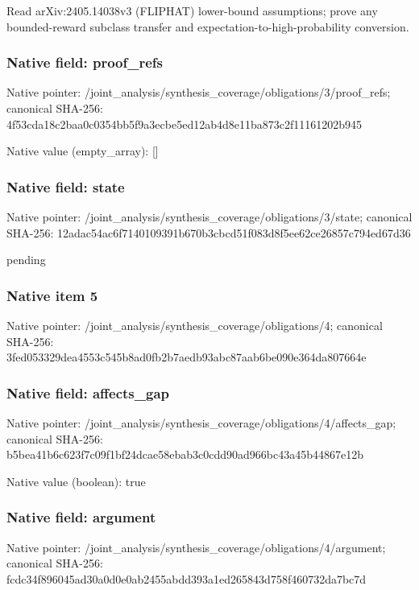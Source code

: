 \documentclass[10pt,a4paper]{article}
\begin{document}
\begingroup\raggedright\sloppy Read arXiv:\allowbreak{}2405.14038v3 (FLIPHAT) lower-bound assumptions;\allowbreak{} prove any bounded-reward subclass transfer and expectation-to-high-probability conversion.\par\endgroup

\subsubsection{Native field: proof\_\allowbreak{}refs}
Native pointer: /joint\_\allowbreak{}analysis/synthesis\_\allowbreak{}coverage/obligations/3/proof\_\allowbreak{}refs; canonical SHA-256: 4f53cda18c2baa0c0354bb5f9a3ecbe5ed12ab4d8e11ba873c2f11161202b945

Native value (empty\_\allowbreak{}array): []

\subsubsection{Native field: state}
Native pointer: /joint\_\allowbreak{}analysis/synthesis\_\allowbreak{}coverage/obligations/3/state; canonical SHA-256: 12adac54ac6f7140109391b670b3cbcd51f083d8f5ee62ce26857c794ed67d36

\begingroup\raggedright\sloppy pending\par\endgroup

\subsubsection{Native item 5}
Native pointer: /joint\_\allowbreak{}analysis/synthesis\_\allowbreak{}coverage/obligations/4; canonical SHA-256: 3fed053329dea4553c545b8ad0fb2b7aedb93abc87aab6be090e364da807664e

\subsubsection{Native field: affects\_\allowbreak{}gap}
Native pointer: /joint\_\allowbreak{}analysis/synthesis\_\allowbreak{}coverage/obligations/4/affects\_\allowbreak{}gap; canonical SHA-256: b5bea41b6c623f7c09f1bf24dcae58ebab3c0cdd90ad966bc43a45b44867e12b

Native value (boolean): true

\subsubsection{Native field: argument}
Native pointer: /joint\_\allowbreak{}analysis/synthesis\_\allowbreak{}coverage/obligations/4/argument; canonical SHA-256: fcdc34f896045ad30a0d0e0ab2455abdd393a1ed265843d758f460732da7bc7d
\end{document}
